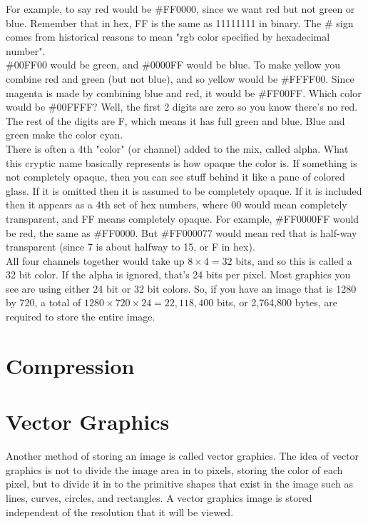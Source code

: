 For example, to say red would be \#FF0000, since we want red but not green or blue. Remember that in hex, FF is the same as 11111111 in binary. The \# sign comes from historical reasons to mean "rgb color specified by hexadecimal number".\\

\#00FF00 would be green, and \#0000FF would be blue. To make yellow you combine red and green (but not blue), and so yellow would be \#FFFF00. Since magenta is made by combining blue and red, it would be \#FF00FF. Which color would be \#00FFFF? Well, the first 2 digits are zero so you know there's no red. The rest of the digits are F, which means it has full green and blue. Blue and green make the color cyan.\\

There is often a 4th "color" (or channel) added to the mix, called alpha. What this cryptic name basically represents is how opaque the color is. If something is not completely opaque, then you can see stuff behind it like a pane of colored glass. If it is omitted then it is assumed to be completely opaque. If it is included then it appears as a 4th set of hex numbers, where 00 would mean completely transparent, and FF means completely opaque. For example, \#FF0000FF would be red, the same as \#FF0000. But \#FF000077 would mean red that is half-way transparent (since 7 is about halfway to 15, or F in hex).\\

All four channels together would take up \(8\times 4 = 32 \) bits, and so this is called a 32 bit color. If the alpha is ignored, that's 24 bits per pixel. Most graphics you see are using either 24 bit or 32 bit colors.  So, if you have an image that is 1280 by 720, a total of \(1280\times720\times24 = 22,118,400\) bits, or 2,764,800 bytes, are required to store the entire image.\\

\section{Compression}

\section{Vector Graphics}

Another method of storing an image is called vector graphics. The idea of vector graphics is not to divide the image area in to pixels, storing the color of each pixel, but to divide it in to the primitive shapes that exist in the image such as lines, curves, circles, and rectangles. A vector graphics image is stored independent of the resolution that it will be viewed.\\

